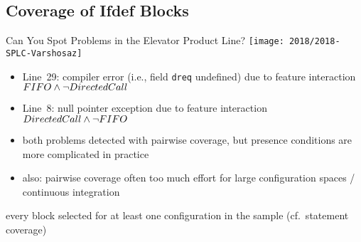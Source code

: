 \subsection{Coverage of Ifdef Blocks}
\begin{frame}[b]
	\begin{example}{Can You Spot Problems in the Elevator Product Line?\mysource{\samplingsurvey}}
		\centering\texttt{[image: 2018/2018-SPLC-Varshosaz]}
	\end{example}
	\pause
	\begin{itemize}
		\item<+-> Line~29: compiler error (i.e., field \texttt{dreq} undefined) %
		due to feature interaction $FIFO \wedge \neg DirectedCall$
		\item<+-> Line~8: null pointer exception %
		due to feature interaction $DirectedCall \wedge \neg FIFO$
		\item<+-> both problems detected with pairwise coverage, but presence conditions are more complicated in practice
		\item<+-> also: pairwise coverage often too much effort for large configuration spaces / continuous integration
	\end{itemize}
	\begin{definition}{\myframetitle\mysource{\tartlerconfigurationcoverage}}
		every block selected for at least one configuration in the sample (cf.\ statement coverage)
	\end{definition}
\end{frame}

